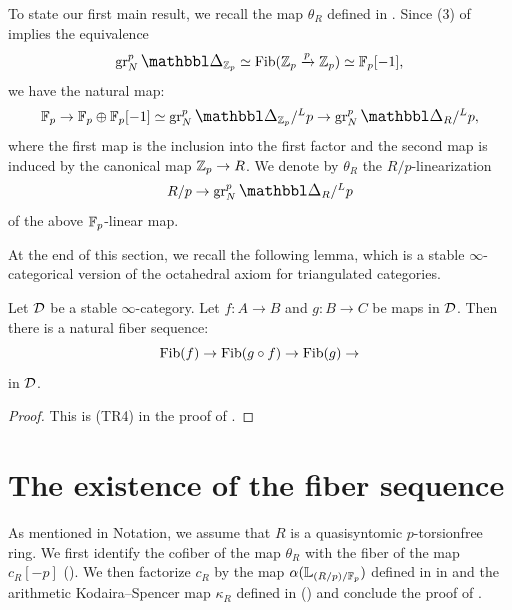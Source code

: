 \documentclass[11pt,a4paper]{amsart}
\begin{document}
\begin{construction}\label{remark2.5}
    To state our first main result, we recall the map $\theta_R$ defined in \cite[]{bhatt2023Syntomic}. Since (3) of  implies the equivalence\[\gr_N^p\prism_{\setZ_p}\simeq \Fib(\setZ_p\xrightarrow[]{p}\setZ_p)\simeq \setF_p[-1],\] we have the natural map:
    \[\setF_p\to \setF_p\oplus\setF_p[-1]\simeq \gr_N^p\prism_{\setZ_p}/^Lp\to\gr_N^p\prism_R/^Lp,\] 
    where the first map is the inclusion into the first factor and the second map is induced by the canonical map $\mathbb{Z}_p\to R$.
    We denote by $\theta_R$ the $R/p$-linearization
    \[R/p\to \gr_N^p\prism_R/^Lp\] of the above $\mathbb{F}_p$-linear map.
\end{construction}
At the end of this section, we recall the following lemma, which is a stable $\infty$-categorical version of the octahedral axiom for triangulated categories.
\begin{lemma}\label{lemma2.9new}
    Let $\mathcal{D}$ be a stable $\infty$-category. Let $f:A\to B$ and $g:B\to C$ be maps in $\mathcal{D}$. Then there is a natural fiber sequence:
    \[\operatorname{Fib}(f)\to \operatorname{Fib}(g\circ f)\to \operatorname{Fib}(g)\to \] in $\mathcal{D}$.
\end{lemma}
\begin{proof}
    This is (TR4) in the proof of \cite[Theorem 1.1.2.14]{lurie2017Higher}.
\end{proof}

\section{The existence of the fiber sequence}
As mentioned in Notation, we assume that $R$ is a quasisyntomic $p$-torsionfree ring.
We first identify the cofiber of the map $\theta_R$ with the fiber of the map $c_R[-p]$ (). We then factorize \(c_R\) by the map \(\alpha(\mathbb{L}_{(R/p)/\mathbb{F}_p})\) defined in \cite{petrov2025Nondecomposability} in  and the arithmetic Kodaira--Spencer map \(\kappa_R\) defined in \cite{shimada2026Arithmetic} () and conclude the proof of .
\end{document}
